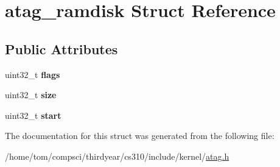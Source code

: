 \hypertarget{structatag__ramdisk}{}\section{atag\+\_\+ramdisk Struct Reference}
\label{structatag__ramdisk}
\subsection*{Public Attributes}
\begin{DoxyCompactItemize}
\item 
\mbox{\label{structatag__ramdisk_a862c814f8ca0e287cb11c6b78806bf32}} 
uint32\+\_\+t {\bfseries flags}
\item 
\mbox{\label{structatag__ramdisk_a932abb397d3983dc0f68b66d4669d48b}} 
uint32\+\_\+t {\bfseries size}
\item 
\mbox{\label{structatag__ramdisk_a8bf84f620659e1273ccee6ea744ed368}} 
uint32\+\_\+t {\bfseries start}
\end{DoxyCompactItemize}


The documentation for this struct was generated from the following file\+:\begin{DoxyCompactItemize}
\item 
/home/tom/compsci/thirdyear/cs310/include/kernel/\mbox{\hyperlink{atag_8h}{atag.\+h}}\end{DoxyCompactItemize}

